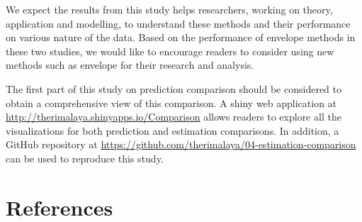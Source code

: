 \documentclass[12pt,3p,authoryear]{elsarticle}
\begin{document}
We expect the results from this study helps researchers, working on theory, application and modelling, to understand these methods and their performance on various nature of the data. Based on the performance of envelope methods in these two studies, we would like to encourage readers to consider using new methods such as envelope for their research and analysis.

The first part of this study \citep{rimal2019pred} on prediction comparison should be considered to obtain a comprehensive view of this comparison. A shiny \citep{shiny} web application at \url{http://therimalaya.shinyapps.io/Comparison} allows readers to explore all the visualizations for both prediction and estimation comparisons. In addition, a GitHub repository at \url{https://github.com/therimalaya/04-estimation-comparison} can be used to reproduce this study.

\hypertarget{references}{%
\section*{References}\label{references}}

\hypertarget{refs}{}


\renewcommand\refname{References}

\end{document}
